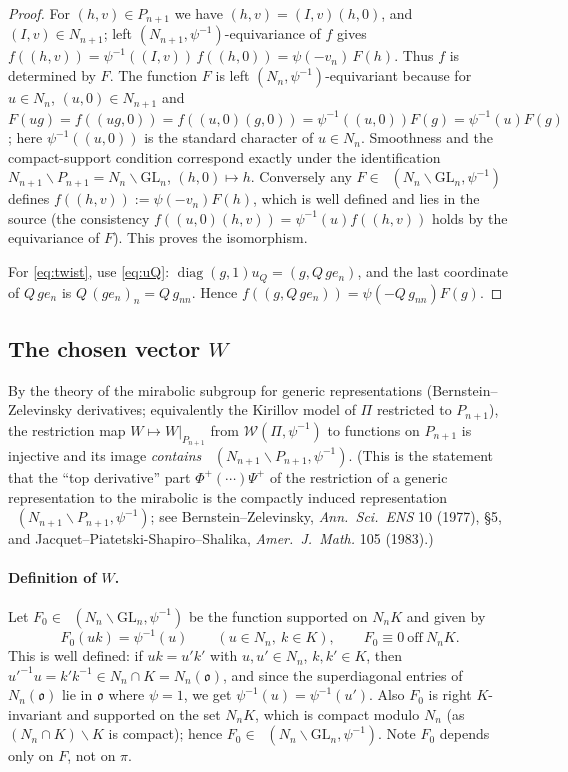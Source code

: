 \documentclass[12pt]{article}
\newcommand{\GL}{\mathrm{GL}}
\newcommand{\oo}{\mathfrak{o}}
\newcommand{\Wmod}{\mathcal{W}}
\newcommand{\diag}{\operatorname{diag}}
\DeclareMathOperator{\Cc}{C_c^\infty}
\begin{document}
\begin{proof}
For $(h,v)\in P_{n+1}$ we have $(h,v)=(I,v)(h,0)$, and $(I,v)\in N_{n+1}$; left
$(N_{n+1},\psi^{-1})$-equivariance of $f$ gives
$f((h,v))=\psi^{-1}((I,v))\,f((h,0))=\psi(-v_n)\,F(h)$.
Thus $f$ is determined by $F$. The function $F$ is left $(N_n,\psi^{-1})$-equivariant
because for $u\in N_n$, $(u,0)\in N_{n+1}$ and
$F(ug)=f((ug,0))=f((u,0)(g,0))=\psi^{-1}((u,0))F(g)=\psi^{-1}(u)F(g)$; here
$\psi^{-1}((u,0))$ is the standard character of $u\in N_n$. Smoothness and the
compact-support condition correspond exactly under the identification
$N_{n+1}\backslash P_{n+1}=N_n\backslash\GL_n$, $(h,0)\mapsto h$. Conversely any
$F\in\Cc(N_n\backslash\GL_n,\psi^{-1})$ defines $f((h,v)):=\psi(-v_n)F(h)$, which
is well defined and lies in the source (the consistency
$f((u,0)(h,v))=\psi^{-1}(u)f((h,v))$ holds by the equivariance of $F$). This proves
the isomorphism.

For \eqref{eq:twist}, use \eqref{eq:uQ}: $\diag(g,1)u_Q=(g,Q\,ge_n)$, and the
last coordinate of $Q\,g e_n$ is $Q\,(g e_n)_n=Q\,g_{nn}$. Hence
$f((g,Q\,ge_n))=\psi(-Q\,g_{nn})F(g)$.
\end{proof}

\subsection{The chosen vector $W$}
\label{sec:chosenW}

By the theory of the mirabolic subgroup for generic representations
(Bernstein--Zelevinsky derivatives; equivalently the Kirillov model of $\Pi$
restricted to $P_{n+1}$), the restriction map
$W\mapsto W|_{P_{n+1}}$ from $\Wmod(\Pi,\psi^{-1})$ to functions on $P_{n+1}$ is
injective and its image \emph{contains} $\Cc(N_{n+1}\backslash P_{n+1},\psi^{-1})$.
(This is the statement that the ``top derivative'' part
$\Phi^+(\cdots)\Psi^+$ of the restriction of a generic representation to the
mirabolic is the compactly induced representation
$\Cc(N_{n+1}\backslash P_{n+1},\psi^{-1})$; see
Bernstein--Zelevinsky, \emph{Ann.\ Sci.\ ENS} 10 (1977), \S5, and
Jacquet--Piatetski-Shapiro--Shalika, \emph{Amer.\ J.\ Math.} 105 (1983).)

\paragraph{Definition of $W$.}
Let $F_0\in\Cc(N_n\backslash\GL_n,\psi^{-1})$ be the function supported on $N_nK$
and given by
\begin{equation}\label{eq:F0}
  F_0(uk)=\psi^{-1}(u)\qquad(u\in N_n,\ k\in K),\qquad F_0\equiv0\ \text{off}\ N_nK.
\end{equation}
This is well defined: if $uk=u'k'$ with $u,u'\in N_n$, $k,k'\in K$, then
$u'^{-1}u=k'k^{-1}\in N_n\cap K=N_n(\oo)$, and since the superdiagonal entries of
$N_n(\oo)$ lie in $\oo$ where $\psi=1$, we get $\psi^{-1}(u)=\psi^{-1}(u')$. Also
$F_0$ is right $K$-invariant and supported on the set $N_nK$, which is compact
modulo $N_n$ (as $(N_n\cap K)\backslash K$ is compact); hence
$F_0\in\Cc(N_n\backslash\GL_n,\psi^{-1})$. Note $F_0$ depends only on $F$, not on
$\pi$.
\end{document}
